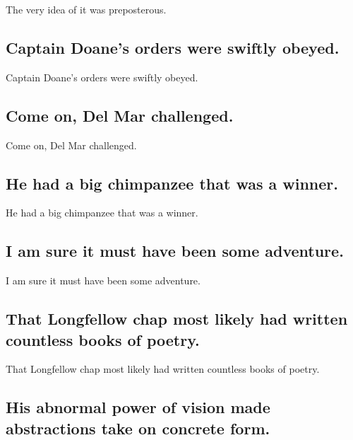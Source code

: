 \documentclass[]{article}
\begin{document}
The very idea of it was preposterous.

\hypertarget{captain-doanes-orders-were-swiftly-obeyed.}{%
\subsection{Captain Doane's orders were swiftly
obeyed.}\label{captain-doanes-orders-were-swiftly-obeyed.}}

Captain Doane's orders were swiftly obeyed.

\hypertarget{come-on-del-mar-challenged.}{%
\subsection{Come on, Del Mar
challenged.}\label{come-on-del-mar-challenged.}}

Come on, Del Mar challenged.

\hypertarget{he-had-a-big-chimpanzee-that-was-a-winner.}{%
\subsection{He had a big chimpanzee that was a
winner.}\label{he-had-a-big-chimpanzee-that-was-a-winner.}}

He had a big chimpanzee that was a winner.

\hypertarget{i-am-sure-it-must-have-been-some-adventure.}{%
\subsection{I am sure it must have been some
adventure.}\label{i-am-sure-it-must-have-been-some-adventure.}}

I am sure it must have been some adventure.

\hypertarget{that-longfellow-chap-most-likely-had-written-countless-books-of-poetry.}{%
\subsection{That Longfellow chap most likely had written countless books
of
poetry.}\label{that-longfellow-chap-most-likely-had-written-countless-books-of-poetry.}}

That Longfellow chap most likely had written countless books of poetry.

\hypertarget{his-abnormal-power-of-vision-made-abstractions-take-on-concrete-form.}{%
\subsection{His abnormal power of vision made abstractions take on
concrete
form.}\label{his-abnormal-power-of-vision-made-abstractions-take-on-concrete-form.}}
\end{document}
